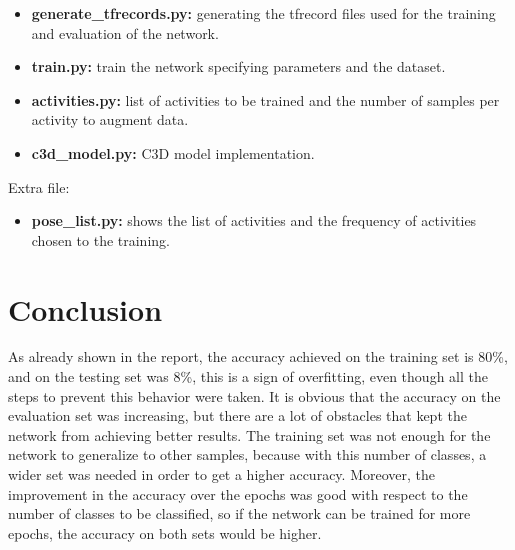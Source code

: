 \documentclass{article}
\begin{document}
\begin{itemize}
    \item \textbf{generate\_tfrecords.py:} generating the tfrecord files used for the training and evaluation of the network.
    \item \textbf{train.py:} train the network specifying parameters and the dataset.
    \item \textbf{activities.py:} list of activities to be trained and the number of samples per activity to augment data.
    \item \textbf{c3d\_model.py:} C3D model implementation.
\end{itemize}

Extra file:

\begin{itemize}
    \item \textbf{pose\_list.py:} shows the list of activities and the frequency of activities chosen to the training.
\end{itemize}


\section{Conclusion}
As already shown in the report, the accuracy achieved on the training set is 80\%, and on the testing set was 8\%, this is a sign of overfitting, even though all the steps to prevent this behavior were taken. It is obvious that the accuracy on the evaluation set was increasing, but there are a lot of obstacles that kept the network from achieving better results. The training set was not enough for the network to generalize to other samples, because with this number of classes, a wider set was needed in order to get a higher accuracy. Moreover, the improvement in the accuracy over the epochs was good with respect to the number of classes to be classified, so if the network can be trained for more epochs, the accuracy on both sets would be higher.


\clearpage



\end{document}
